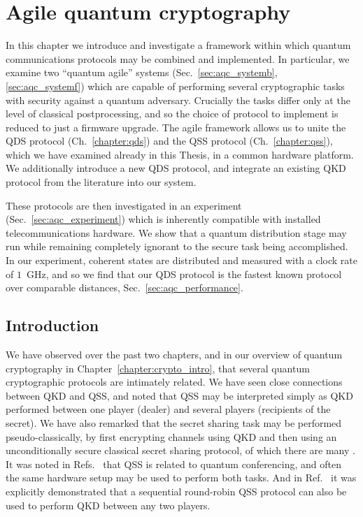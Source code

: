 



\chapter{Agile quantum cryptography}\label{chapter:aqc}

In this chapter we introduce and investigate a framework within which quantum communications protocols may be combined and implemented. In particular, we examine two ``quantum agile'' systems (Sec.~\ref{sec:aqc_systemb}, \ref{sec:aqc_systemf}) which are capable of performing several cryptographic tasks with security against a quantum adversary. Crucially the tasks differ only at the level of classical postprocessing, and so the choice of protocol to implement is reduced to just a firmware upgrade. The agile framework allows us to unite the QDS protocol (Ch.~\ref{chapter:qds}) and the QSS protocol (Ch.~\ref{chapter:qss}), which we have examined already in this Thesis, in a common hardware platform. We additionally introduce a new QDS protocol, and integrate an existing QKD protocol from the literature into our system.

These protocols are then investigated in an experiment (Sec.~\ref{sec:aqc_experiment}) which is inherently compatible with installed telecommunications hardware. We show that a quantum distribution stage may run while remaining completely ignorant to the secure task being accomplished. In our experiment, coherent states are distributed and measured with a clock rate of $1$~GHz, and so we find that our QDS protocol is the fastest known protocol over comparable distances, Sec.~\ref{sec:aqc_performance}.

\section{Introduction}

We have observed over the past two chapters, and in our overview of quantum cryptography in Chapter~\ref{chapter:crypto_intro}, that several quantum cryptographic protocols are intimately related. We have seen close connections between QKD and QSS, and noted that QSS may be interpreted simply as QKD performed between one player (dealer) and several players (recipients of the secret). We have also remarked that the secret sharing task may be performed pseudo-classically, by first encrypting channels using QKD and then using an unconditionally secure classical secret sharing protocol, of which there are many \cite{Shamir1979, Blakley1979, Schneier1996}. It was noted in Refs.~\cite{Hillery1999, Chen2005a, Wu2016, Ottaviani2017b} that QSS is related to quantum conferencing, and often the same hardware setup may be used to perform both tasks. And in Ref.~\cite{Grice2019} it was explicitly demonstrated that a sequential round-robin QSS protocol can also be used to perform QKD between any two players. 


